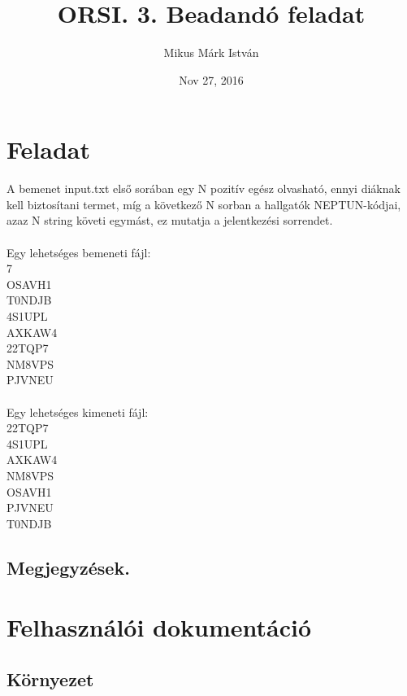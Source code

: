 \documentclass[a4paper,12pt]{amsart}%
\begin{document}

% 

\title{ ORSI. 3. Beadandó feladat }
\author{Mikus Márk István}
\date{Nov 27, 2016}
\maketitle

\section{Feladat}
A bemenet input.txt első sorában egy N pozitív egész olvasható, ennyi diáknak kell biztosítani termet, míg a következő N sorban a hallgatók NEPTUN-kódjai, azaz N string követi egymást, ez mutatja a jelentkezési sorrendet.\\
\\
Egy lehetséges bemeneti fájl:\\
7\\
OSAVH1\\
T0NDJB\\
4S1UPL\\
AXKAW4\\
22TQP7\\
NM8VPS\\
PJVNEU\\
\\
Egy lehetséges kimeneti fájl:
\\
22TQP7\\
4S1UPL\\
AXKAW4\\
NM8VPS\\
OSAVH1\\
PJVNEU\\
T0NDJB\\

\subsection{Megjegyzések.}


\section{Felhasználói dokumentáció}

\subsection{Környezet}
\end{document}
